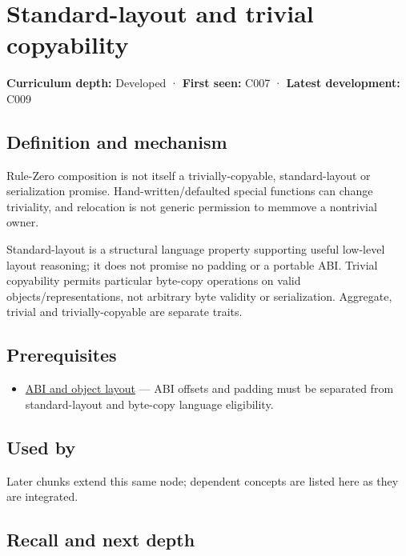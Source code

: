 \hypertarget{appendix-958870a64c53}{}\label{referencestart:appendix-958870a64c53}
\section{Standard-layout and trivial copyability}\label{appendix-958870a64c53-standard-layout-and-trivial-copyability}

\textbf{Curriculum depth:} Developed · \textbf{First seen:} C007 · \textbf{Latest development:} C009

\subsection{Definition and mechanism}\label{appendix-958870a64c53-definition-and-mechanism}

Rule-Zero composition is not itself a trivially-copyable, standard-layout or serialization promise. Hand-written/defaulted special functions can change triviality, and relocation is not generic permission to memmove a nontrivial owner.

Standard-layout is a structural language property supporting useful low-level layout reasoning; it does not promise no padding or a portable ABI. Trivial copyability permits particular byte-copy operations on valid objects/representations, not arbitrary byte validity or serialization. Aggregate, trivial and trivially-copyable are separate traits.

\subsection{Prerequisites}\label{appendix-958870a64c53-prerequisites}

\begin{itemize}
\tightlist
\item
  \hyperref[appendix-c4ac6bb0fff8]{ABI and object layout} --- ABI offsets and padding must be separated from standard-layout and byte-copy language eligibility.
\end{itemize}

\subsection{Used by}\label{appendix-958870a64c53-used-by}

Later chunks extend this same node; dependent concepts are listed here as they are integrated.

\subsection{Recall and next depth}\label{appendix-958870a64c53-recall-and-next-depth}

